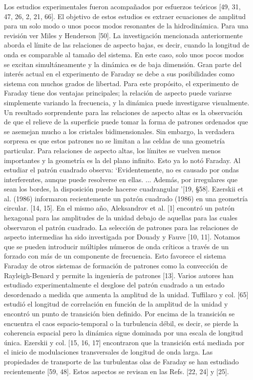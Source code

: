Los estudios experimentales fueron acompañados por esfuerzos teóricos [49, 31, 47, 26, 2, 21, 66]. El objetivo de estos estudios es extraer ecuaciones de amplitud para un solo modo o unos pocos modos resonantes de la hidrodinámica. Para una revisión ver Miles y Henderson [50].
La investigación mencionada anteriormente aborda el límite de las relaciones de aspecto bajas, es decir, cuando la longitud de onda es comparable al tamaño del sistema. En este caso, solo unos pocos modos se excitan simultáneamente y la dinámica es de baja dimensión. Gran parte del interés actual en el experimento de Faraday se debe a sus posibilidades como sistema con muchos grados de libertad. Para este propósito, el experimento de Faraday tiene dos ventajas principales; la relación de aspecto puede variarse simplemente variando la frecuencia, y la dinámica puede investigarse visualmente.
Un resultado sorprendente para las relaciones de aspecto altas es la observación de que el relieve de la superficie puede tomar la forma de patrones ordenados que se asemejan mucho a los cristales bidimensionales. Sin embargo, la verdadera sorpresa es que estos patrones no se limitan a las celdas de una geometría particular. Para relaciones de aspecto altas, los límites se vuelven menos importantes y la geometría es la del plano infinito. Esto ya lo notó Faraday. Al estudiar el patrón cuadrado observa: `Evidentemente, no es causado por ondas interferentes, aunque puede resolverse en ellas. ... Además, por irregulares que sean los bordes, la disposición puede hacerse cuadrangular '[19, §58]. Ezerskii et al. (1986) informaron recientemente un patrón cuadrado (1986) en una geometría circular. [14, 15]. En el mismo año, Aleksandrov et al. [1] encontró un patrón hexagonal para las amplitudes de la unidad debajo de aquellas para las cuales observaron el patrón cuadrado. La selección de patrones para las relaciones de aspecto intermedias ha sido investigada por Douady y Fauve [10, 11]. Notamos que se pueden introducir múltiples números de onda críticos a través de un forzado con más de un componente de frecuencia. Esto favorece el sistema Faraday de otros sistemas de formación de patrones como la convección de Rayleigh-Benard y permite la ingeniería de patrones [13].
Varios autores han estudiado experimentalmente el desglose del patrón cuadrado a un estado desordenado a medida que aumenta la amplitud de la unidad. Tuffilaro y col. [65] estudió el
longitud de correlación en función de la amplitud de la unidad y encontró un punto de transición bien definido. Por encima de la transición se encuentra el caos espacio-temporal o la turbulencia débil, es decir, se pierde la coherencia espacial pero la dinámica sigue dominada por una escala de longitud única. Ezerskii y col. [15, 16, 17] encontraron que la transición está mediada por el inicio de modulaciones transversales de longitud de onda larga. Las propiedades de transporte de las turbulentas olas de Faraday se han estudiado recientemente [59, 48]. Estos aspectos se revisan en las Refs. [22, 24] y [25].
